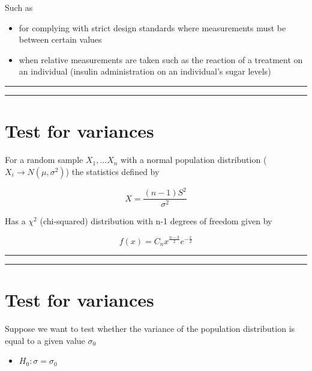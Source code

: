 \documentclass[
]{book}
\providecommand{\tightlist}{%
  \setlength{\itemsep}{0pt}\setlength{\parskip}{0pt}}
\begin{document}
Such as

\begin{itemize}
\tightlist
\item
  for complying with strict design standards where measurements must be between certain values
\item
  when relative measurements are taken such as the reaction of a treatment on an individual (insulin administration on an individual's sugar levels)
\end{itemize}

\begin{center}\rule{0.5\linewidth}{0.5pt}\end{center}

\begin{center}\rule{0.5\linewidth}{0.5pt}\end{center}

\hypertarget{test-for-variances-1}{%
\section{Test for variances}\label{test-for-variances-1}}

For a random sample \(X_1,...X_n\) with a normal population distribution (\(X_i \rightarrow N(\mu, \sigma^2)\)) the statistics defined by

\[X=\frac{(n-1)S^2}{\sigma^2}\]

Has a \(\chi^2\) (chi-squared) distribution with n-1 degrees of freedom given by

\[f(x)=C_n  x^{\frac{n-3}{2}} e^{-\frac{x}{2}}\]

\begin{center}\rule{0.5\linewidth}{0.5pt}\end{center}

\begin{center}\rule{0.5\linewidth}{0.5pt}\end{center}

\hypertarget{test-for-variances-2}{%
\section{Test for variances}\label{test-for-variances-2}}

Suppose we want to test whether the variance of the population distribution is equal to a given value \(\sigma_0\)

\begin{itemize}
\tightlist
\item
  \(H_0:\sigma=\sigma_0\)
\end{itemize}
\end{document}
